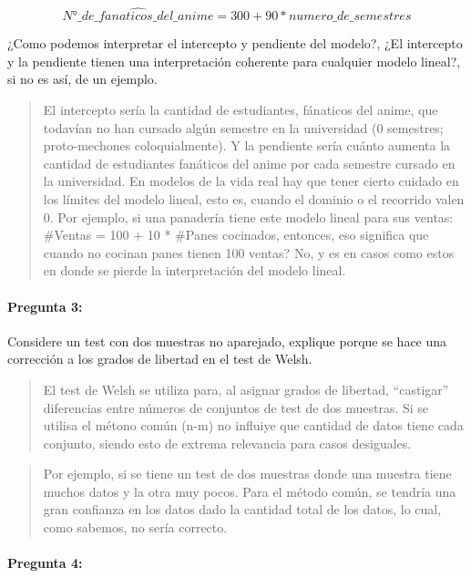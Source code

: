 \documentclass[]{article}
\let\oldparagraph\paragraph
\renewcommand{\paragraph}[1]{\oldparagraph{#1}\mbox{}}
\begin{document}
\[\hat{N°\_de\_fanaticos\_del\_anime}=300+90*numero\_de\_semestres\]

¿Como podemos interpretar el intercepto y pendiente del modelo?, ¿El
intercepto y la pendiente tienen una interpretación coherente para
cualquier modelo lineal?, si no es así, de un ejemplo.

\begin{quote}
El intercepto sería la cantidad de estudiantes, fánaticos del anime, que
todavían no han cursado algún semestre en la universidad (0 semestres;
proto-mechones coloquialmente). Y la pendiente sería cuánto aumenta la
cantidad de estudiantes fanáticos del anime por cada semestre cursado en
la universidad. En modelos de la vida real hay que tener cierto cuidado
en los límites del modelo lineal, esto es, cuando el dominio o el
recorrido valen 0. Por ejemplo, si una panadería tiene este modelo
lineal para sus ventas: \#Ventas = 100 + 10 * \#Panes cocinados,
entonces, eso significa que cuando no cocinan panes tienen 100 ventas?
No, y es en casos como estos en donde se pierde la interpretación del
modelo lineal.
\end{quote}

\hypertarget{pregunta-3}{%
\paragraph{\texorpdfstring{\textbf{Pregunta
3:}}{Pregunta 3:}}\label{pregunta-3}}

Considere un test con dos muestras no aparejado, explique porque se hace
una corrección a los grados de libertad en el test de Welsh.

\begin{quote}
El test de Welsh se utiliza para, al asignar grados de libertad,
``castigar'' diferencias entre números de conjuntos de test de dos
muestras. Si se utilisa el métono común (n-m) no influiye que cantidad
de datos tiene cada conjunto, siendo esto de extrema relevancia para
casos desiguales.
\end{quote}

\begin{quote}
Por ejemplo, si se tiene un test de dos muestras donde una muestra tiene
muchos datos y la otra muy pocos. Para el método común, se tendría una
gran confianza en los datos dado la cantidad total de los datos, lo
cual, como sabemos, no sería correcto.
\end{quote}

\hypertarget{pregunta-4}{%
\paragraph{\texorpdfstring{\textbf{Pregunta
4:}}{Pregunta 4:}}\label{pregunta-4}}
\end{document}
